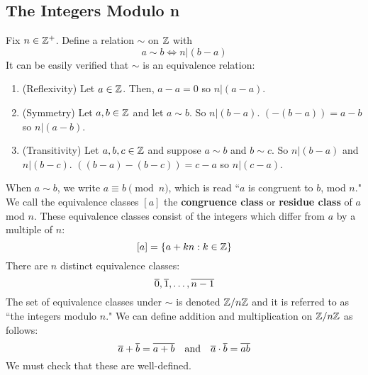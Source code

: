 \documentclass[10pt, oneside]{article}
\begin{document}
\subsection{The Integers Modulo n}
Fix $n\in\mathbb{Z}^+$. Define a relation $\sim$ on $\mathbb{Z}$ with
\[ a\sim b \iff n|(b-a)\]
It can be easily verified that $\sim$ is an equivalence relation:
\begin{enumerate}
    \item (Reflexivity) Let $a\in\mathbb{Z}$. Then, $a-a = 0$ so $n|(a-a)$.
    \item (Symmetry) Let $a,b\in \mathbb{Z}$ and let $a\sim b$. So $n|(b-a)$. $(-(b-a)) = a-b$ so $n|(a-b)$. 
    \item (Transitivity) Let $a,b,c\in \mathbb{Z}$ and suppose $a\sim b$ and $b\sim c$. So $n|(b-a)$ and $n|(b-c)$. $((b-a)-(b-c)) = c-a$ so $n|(c-a)$.
\end{enumerate}
When $a\sim b$, we write $a\equiv b\pmod{n}$, which is read ``$a$ is congruent to $b$, mod $n$." We call the equivalence classes $[a]$ the \textbf{congruence class} or \textbf{residue class} of $a$ mod $n$. These equivalence classes consist of the integers which differ from $a$ by a multiple of $n$:
\[ [a] = \{a + kn: k\in\mathbb{Z}\}\]
There are $n$ distinct equivalence classes:
\[ \overline{0}, \overline{1}, \dots, \overline{n-1} \]
The set of equivalence classes under $\sim$ is denoted $\mathbb{Z}/n\mathbb{Z}$ and it is referred to as ``the integers modulo $n$." We can define addition and multiplication on $\mathbb{Z}/n\mathbb{Z}$ as follows:
\[ \overline{a} + \overline{b} = \overline{a+b} \quad\text{and}\quad \overline{a} \cdot \overline{b} = \overline{ab}\]
We must check that these are well-defined. 
\end{document}

